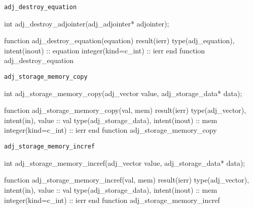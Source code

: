 \begin{boxwithtitle}{\texttt{adj_destroy_equation}}
\begin{minipage}{\columnwidth}
\begin{ccode}
  int adj_destroy_adjointer(adj_adjointer* adjointer);
\end{ccode}
\begin{fortrancode}
  function adj_destroy_equation(equation) result(ierr)
    type(adj_equation), intent(inout) :: equation
    integer(kind=c_int) :: ierr
  end function adj_destroy_equation
\end{fortrancode}
\end{minipage}
\end{boxwithtitle}


\begin{boxwithtitle}{\texttt{adj_storage_memory_copy}}
\begin{minipage}{\columnwidth}
\begin{ccode}
  int adj_storage_memory_copy(adj_vector value, adj_storage_data* data);
\end{ccode}
\begin{fortrancode}
  function adj_storage_memory_copy(val, mem) result(ierr)
    type(adj_vector), intent(in), value :: val
    type(adj_storage_data), intent(inout) :: mem
    integer(kind=c_int) :: ierr
  end function adj_storage_memory_copy
\end{fortrancode}
\end{minipage}
\end{boxwithtitle}


\begin{boxwithtitle}{\texttt{adj_storage_memory_incref}}
\begin{minipage}{\columnwidth}
\begin{ccode}
  int adj_storage_memory_incref(adj_vector value, adj_storage_data* data);
\end{ccode}
\begin{fortrancode}
  function adj_storage_memory_incref(val, mem) result(ierr)
    type(adj_vector), intent(in), value :: val
    type(adj_storage_data), intent(inout) :: mem
    integer(kind=c_int) :: ierr
  end function adj_storage_memory_incref
\end{fortrancode}
\end{minipage}
\end{boxwithtitle}


